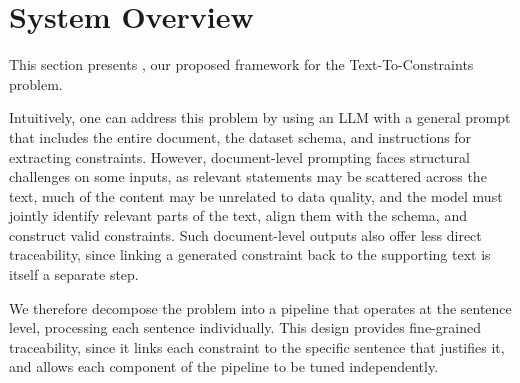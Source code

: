 \section{System Overview}
\label{sec:overview}


This section presents \system, our proposed framework for the Text-To-Constraints problem. 

Intuitively, one can address this problem by using an LLM with a general prompt that includes the entire document, the dataset schema, and instructions for extracting constraints. However, document-level prompting faces structural challenges on some inputs, as relevant statements may be scattered across the text, much of the content may be unrelated to data quality, and the model must jointly identify relevant parts of the text, align them with the schema, and construct valid constraints. 
Such document-level outputs also offer less direct traceability, since linking a generated constraint back to the supporting text is itself a separate step.

We therefore decompose the problem into a pipeline that operates at the sentence level, processing each sentence individually. This design provides fine-grained traceability, since it links each constraint to the specific sentence that justifies it, and allows each component of the pipeline to be tuned independently.

